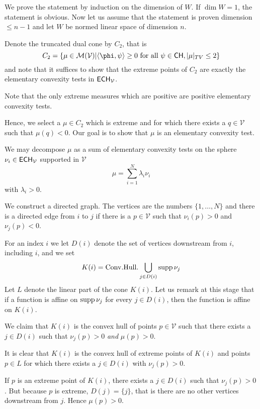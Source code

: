 \documentclass[12pt]{amsart}
\begin{document}
\begin{Proof}
	We prove the statement by induction on the dimension of $W$. If $\dim W = 1$, the statement is obvious. Now let us assume that the statement is proven dimension $\leq n-1$ and let $W$ be normed linear space of dimension $n$.
	
	Denote the truncated dual cone by $C_2$, that is
	\[
	C_2 = \set{ \mu \in \mathcal{M}(\mathcal{V})  \middle| \langle \phi, \psi \rangle \geq 0 \text{ for all } \psi \in \mathsf{CH}, |\mu|_{TV} \leq 2 }
	\]
	and note that it suffices to show that the extreme points of $C_2$ are exactly the elementary convexity tests in $\mathsf{ECH}_{\mathcal{V}}$. 
	
	Note that the only extreme measures which are positive are positive elementary convexity tests.
	
	Hence, we select a $\mu \in C_2$ which is extreme and for which there exists a $q \in \mathcal{V}$ such that $\mu(q) < 0$. Our goal is to show that $\mu$ is an elementary convexity test.
	
	We may decompose $\mu$ as a sum of elementary convexity tests on the sphere $\nu_i \in \mathsf{ECH}_{\mathcal{V}}$ supported in $\mathcal{V}$
	\[
	\mu = \sum_{i=1}^N \lambda_i \nu_i
	\]
	with $\lambda_i > 0$.
	
	We construct a directed graph. The vertices are the numbers $\{1, \dots, N \}$ and there is a directed edge from $i$ to $j$ if there is a $p \in \mathcal{V}$ such that $\nu_i(p) > 0$ and $\nu_j(p) < 0$. 
	
	For an index $i$ we let $D(i)$ denote the set of vertices downstream from $i$, including $i$, and we set
	\[
	K(i) = \mathrm{Conv.Hull.} \bigcup_{j \in D(i)} \operatorname{\mathrm{supp}} \nu_j
	\]
	Let $L$ denote the linear part of the cone $K(i)$. Let us remark at this stage that if a function is affine on $\operatorname{\mathrm{supp}} \nu_j$ for every $j \in D(i)$, then the function is affine on $K(i)$.
	
	We claim that $K(i)$ is the convex hull of points $p \in \mathcal{V}$ such that there exists a $j \in D(i)$ such that $\nu_j(p) > 0$ \emph{and} $\mu(p) > 0$. 
	
	It is clear that $K(i)$ is the convex hull of extreme points of $K(i)$ and points $p \in L$ for which there exists a $j \in D(i)$ with $\nu_j(p) > 0$. 

	If $p$ is an extreme point of $K(i)$, there exists a $j \in D(i)$ such that $\nu_j(p) > 0$. But because $p$ is extreme, $D(j) = \{j\}$, that is there are no other vertices downstream from $j$. Hence $\mu(p) > 0$. 


\end{Proof}
\end{document}
